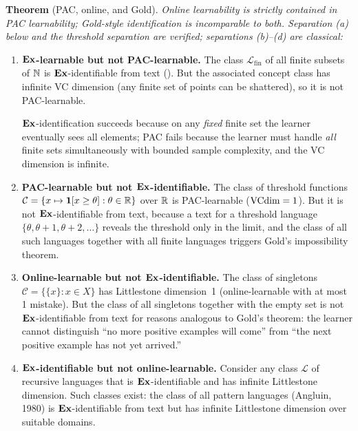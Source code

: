 \begin{separation}
\textbf{Theorem} (PAC, online, and Gold). \textit{Online learnability is strictly contained in PAC learnability; Gold-style identification is incomparable to both. Separation (a) below and the threshold separation are verified; separations (b)--(d) are classical:}

\begin{enumerate}[label=(\alph*),leftmargin=*,itemsep=4pt]
\item \textbf{$\mathbf{Ex}$-learnable but not PAC-learnable.} The class $\mathcal{L}_{\mathrm{fin}}$ of all finite subsets of $\mathbb{N}$ is $\mathbf{Ex}$-identifiable from text (). But the associated concept class has infinite VC dimension (any finite set of points can be shattered), so it is not PAC-learnable.

$\mathbf{Ex}$-identification succeeds because on any \emph{fixed} finite set the learner eventually sees all elements; PAC fails because the learner must handle \emph{all} finite sets simultaneously with bounded sample complexity, and the VC dimension is infinite.

\item \textbf{PAC-learnable but not $\mathbf{Ex}$-identifiable.} The class of threshold functions $\mathcal{C} = \{x \mapsto \mathbf{1}[x \geq \theta] : \theta \in \mathbb{R}\}$ over $\mathbb{R}$ is PAC-learnable ($\mathrm{VCdim} = 1$). But it is not $\mathbf{Ex}$-identifiable from text, because a text for a threshold language $\{\theta, \theta+1, \theta+2, \ldots\}$ reveals the threshold only in the limit, and the class of all such languages together with all finite languages triggers Gold's impossibility theorem.

\item \textbf{Online-learnable but not $\mathbf{Ex}$-identifiable.} The class of singletons $\mathcal{C} = \{\{x\} : x \in X\}$ has Littlestone dimension~1 (online-learnable with at most 1 mistake). But the class of all singletons together with the empty set is not $\mathbf{Ex}$-identifiable from text for reasons analogous to Gold's theorem: the learner cannot distinguish ``no more positive examples will come'' from ``the next positive example has not yet arrived.''

\item \textbf{$\mathbf{Ex}$-identifiable but not online-learnable.} Consider any class $\mathcal{L}$ of recursive languages that is $\mathbf{Ex}$-identifiable and has infinite Littlestone dimension. Such classes exist: the class of all pattern languages (Angluin, 1980) is $\mathbf{Ex}$-identifiable from text but has infinite Littlestone dimension over suitable domains.
\end{enumerate}
\end{separation}

